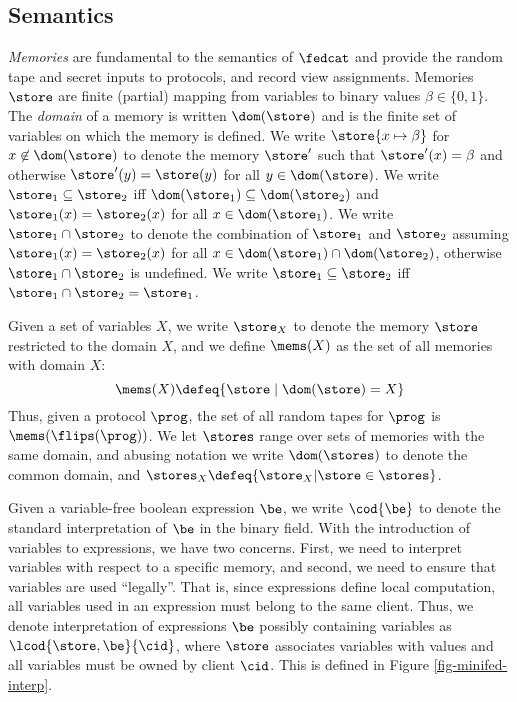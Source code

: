 \subsection{Semantics}

\emph{Memories} are fundamental to the semantics of $\fedcat$ and
provide the random tape and secret inputs to protocols, and record
view assignments. Memories $\store$ are finite (partial) mapping from
variables to binary values $\beta \in \{0,1\}$. The \emph{domain} of a
memory is written $\dom(\store)$ and is the finite set of variables on
which the memory is defined. We write $\store\{ x \mapsto \beta\}$ for
$x\not\in\dom(\store)$ to denote the memory $\store'$ such that
$\store'(x) = \beta$ and otherwise $\store'(y) = \store(y)$ for all $y
\in \dom(\store)$. We write $\store_1 \subseteq \store_2$ iff
$\dom(\store_1) \subseteq \dom(\store_2)$ and $\store_1(x) =
\store_2(x)$ for all $x \in \dom(\store_1)$. We write $\store_1 \cap
\store_2$ to denote the combination of $\store_1$ and $\store_2$
assuming $\store_1(x) = \store_2(x)$ for all $x \in \dom(\store_1)
\cap \dom(\store_2)$, otherwise $\store_1 \cap \store_2$ is undefined.
We write $\store_1 \subseteq \store_2$ iff $\store_1 \cap \store_2
= \store_1$.

Given a set of variables $X$, we write $\store_X$ to denote the
memory $\store$ restricted to the domain $X$, and we define
$\mems(X)$ as the set of all memories with domain $X$:
$$
\mems(X) \defeq \{ \store \mid \dom(\store) = X \}
$$
Thus, given a protocol $\prog$, the set of all random tapes for
$\prog$ is $\mems(\flips(\prog))$. We let $\stores$ range
over sets of memories with the same domain, and abusing notation
we write $\dom(\stores)$ to denote the common domain,
and $\stores_X \defeq \{ \store_X | \store \in \stores \}$.

Given a variable-free boolean expression $\be$, we write $\cod{\be}$
to denote the standard interpretation of $\be$ in the binary field.
With the introduction of variables to expressions, we have two
concerns. First, we need to interpret variables with respect to a
specific memory, and second, we need to ensure that variables are used
``legally''. That is, since expressions define local computation, all
variables used in an expression must belong to the same client.  Thus,
we denote interpretation of expressions $\be$ possibly containing
variables as $\lcod{\store,\be}{\cid}$, where $\store$ associates
variables with values and all variables must be owned by client
$\cid$. This is defined in Figure \ref{fig-minifed-interp}.

